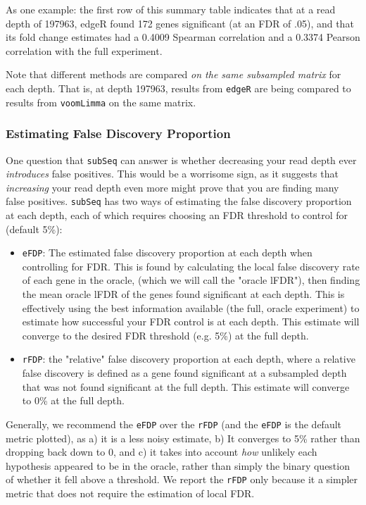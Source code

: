 \documentclass{article}\usepackage[]{graphicx}\usepackage[]{color}
\begin{document}
As one example: the first row of this summary table indicates that at a read depth of 197963, edgeR found 172 genes significant (at an FDR of .05), and that its fold change estimates had a 0.4009 Spearman correlation and a 0.3374 Pearson correlation with the full experiment.

Note that different methods are compared \emph{on the same subsampled matrix} for each depth. That is, at depth 197963, results from \texttt{edgeR} are being compared to results from \texttt{voomLimma} on the same matrix.

\subsubsection{Estimating False Discovery Proportion}

One question that \texttt{subSeq} can answer is whether decreasing your read depth ever \emph{introduces} false positives. This would be a worrisome sign, as it suggests that \emph{increasing} your read depth even more might prove that you are finding many false positives. \texttt{subSeq} has two ways of estimating the false discovery proportion at each depth, each of which requires choosing an FDR threshold to control for (default 5\%):

\begin{itemize}
\item \texttt{eFDP}: The estimated false discovery proportion at each depth when controlling for FDR. This is found by calculating the local false discovery rate of each gene in the oracle, (which we will call the "oracle lFDR"), then finding the mean oracle lFDR of the genes found significant at each depth. This is effectively using the best information available (the full, oracle experiment) to estimate how successful your FDR control is at each depth. This estimate will converge to the desired FDR threshold (e.g. 5\%) at the full depth.
\item \texttt{rFDP}: the "relative" false discovery proportion at each depth, where a relative false discovery is defined as a gene found significant at a subsampled depth that was not found significant at the full depth. This estimate will converge to 0\% at the full depth.
\end{itemize}

Generally, we recommend the \texttt{eFDP} over the \texttt{rFDP} (and the \texttt{eFDP} is the default metric plotted), as a) it is a less noisy estimate, b) It converges to 5\% rather than dropping back down to 0, and c) it takes into account \emph{how} unlikely each hypothesis appeared to be in the oracle, rather than simply the binary question of whether it fell above a threshold. We report the \texttt{rFDP} only because it a simpler metric that does not require the estimation of local FDR.  
\end{document}
